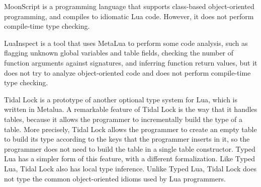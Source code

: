 MoonScript \citep{moonscript} is a programming language that supports
class-based object-oriented programming, and compiles to idiomatic
Lua code.
However, it does not perform compile-time type checking.

LuaInspect \citep{luainspect} is a tool that uses MetaLua to perform
some code analysis, such as flagging unknown global variables and
table fields, checking the number of function arguments against
signatures, and inferring function return values, but it does not
try to analyze object-oriented code and does not perform compile-time
type checking.

Tidal Lock \citep{tidallock} is a prototype of another optional type
system for Lua, which is written in Metalua.
A remarkable feature of Tidal Lock is the way that it handles tables,
because it allows the programmer to incrementally build the type of
a table.
More precisely, Tidal Lock allows the programmer to create an empty
table to build its type according to the keys that the programmer
inserts in it, so the programmer does not need to build the table in
a single table constructor.
Typed Lua has a simpler form of this feature, with a different
formalization.
Like Typed Lua, Tidal Lock also has local type inference.
Unlike Typed Lua, Tidal Lock does not type the common object-oriented
idioms used by Lua programmers.


